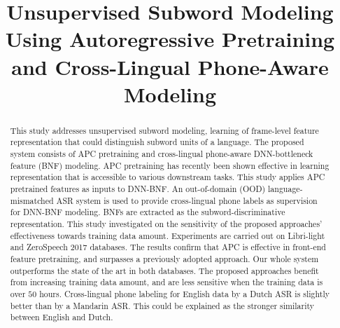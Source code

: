 \documentclass[a4paper]{article}
\title{Unsupervised Subword Modeling Using Autoregressive Pretraining and Cross-Lingual Phone-Aware Modeling}
\begin{document}
\maketitle
% 
\begin{abstract}
This study addresses unsupervised subword modeling, learning of frame-level feature representation that could distinguish subword units of a language. 
The proposed system consists of APC pretraining  and cross-lingual phone-aware DNN-bottleneck feature (BNF) modeling. APC pretraining has recently been shown effective in learning representation that is accessible to various downstream tasks. This study applies APC pretrained features as inputs to DNN-BNF. An out-of-domain (OOD) language-mismatched  ASR system is used to provide cross-lingual phone labels as supervision for DNN-BNF modeling. BNFs are extracted as the subword-discriminative  representation. This study investigated on the sensitivity of the proposed approaches' effectiveness towards training data amount. Experiments are carried out on Libri-light and ZeroSpeech 2017 databases. The results confirm that  APC  is effective in front-end feature pretraining, and surpasses a previously adopted approach. 
Our whole system outperforms the state of the art in both databases. 
The proposed approaches benefit from increasing training data amount, and are less sensitive when the training data is over $50$ hours.  
Cross-lingual phone labeling for English data by a Dutch ASR is slightly better than by a Mandarin ASR. This could be explained as the stronger similarity between English and Dutch.  



\end{abstract}
\end{document}
